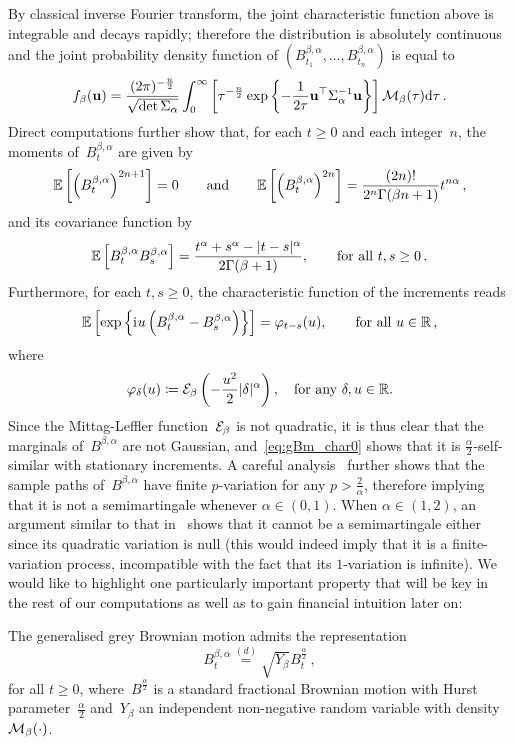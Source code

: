 By classical inverse Fourier transform, the joint characteristic function above is integrable and decays rapidly; therefore the distribution is absolutely continuous and the joint probability density function of $\left(B^{\beta, \alpha}_{t_1}, \ldots, B^{\beta, \alpha}_{t_n}\right)$ is equal to~\cite{daSilva2020SingularityMotion}
$$
    f_\beta(\boldsymbol{\mathrm{u}}) = 
    \frac{(2\pi)^{-\frac{n}{2}}}{\sqrt{\operatorname{det} \Sigma_\alpha}} 
    \int_0^{\infty}
    \left[\tau^{-\frac{n}{2}}\exp\left\{-\frac{1}{2\tau}
    \boldsymbol{\mathrm{u}}^{\top} \Sigma_\alpha^{-1} \boldsymbol{\mathrm{u}}\right\} \right]\mathcal{M}_{\beta}(\tau) \mathrm{d} \tau\,.
$$
Direct computations further show that, 
for each $t \geq 0$ and each integer~$n$, the moments of~$B_t^{\beta, \alpha}$ are given by
$$
\mathbb{E}\left[\left(B_t^{\beta, \alpha}\right)^{2 n+1}\right] = 0
\qquad\text{and}\qquad
\mathbb{E}\left[\left(B_t^{\beta, \alpha}\right)^{2 n}\right] = \frac{(2 n) !}{2^n \Gamma(\beta n+1)} t^{n \alpha}\,,
$$ 
and its covariance function by
$$
    \mathbb{E}\left[B_t^{\beta, \alpha} B_s^{\beta, \alpha}\right]
     = \frac{t^\alpha+s^\alpha-|t-s|^\alpha}{2 \Gamma(\beta+1)}, \qquad \text{for all } t, s \geq 0 \,.
    $$
Furthermore, for each $t, s \geq 0$, the characteristic function of the increments reads
\begin{equation}\label{eq:gBm_char0} \mathbb{E}\left[\exp\left\{{\mathrm{i}\mkern1mu} u\left(B_t^{\beta, \alpha}-B_s^{\beta, \alpha}\right)\right\}\right]
    = \varphi_{t-s}(u), 
    \qquad \text{for all } u \in \mathbb{R}\,, 
\end{equation}
    where
\begin{equation}\label{eq:gBm_char}
\varphi_{\delta}(u)\coloneqq\mathcal{E}_{\beta}\left(-\frac{u^2}{2}|\delta|^\alpha\right), \quad \textup{for any } \delta, u\in\mathbb{R}.
\end{equation}
Since the Mittag-Leffler function~$\mathcal{E}_{\beta}$ is not quadratic, it is thus clear that the marginals of~$B^{\beta, \alpha}$ are not Gaussian,
and~\eqref{eq:gBm_char0} shows that it is $\frac{\alpha}{2}$-self-similar with stationary increments.
A careful analysis~\cite{daSilva2018SingularityParameters} further shows that the sample paths of~$B^{\beta, \alpha}$ have finite $p$-variation for any $p>\frac{2}{\alpha}$, therefore implying that it is not a semimartingale whenever $\alpha\in(0,1)$.
When $\alpha \in (1,2)$, an argument similar to that in~\cite{Rogers1997ArbitrageMotion} shows that it cannot be a semimartingale either since its quadratic variation is null (this would indeed imply that it is a finite-variation process, incompatible with the fact that its $1$-variation is infinite).
We would like to highlight one particularly important property that will be key in the rest of our computations as well as to gain financial intuition later on:
\begin{lemma}\label{lem:gBm_decomposition}
The generalised grey Brownian motion admits the representation
    $$
    B_t^{\beta, \alpha} \stackrel{(d)}{=}
    \sqrt{Y_\beta} B_t^{\frac{\alpha}{2}}\,,
    $$
    for all $t \geq 0$, where~$B^{\frac{\alpha}{2}}$ is a standard fractional Brownian motion with Hurst parameter~$\frac{\alpha}{2}$ and~$Y_\beta$ an independent non-negative random variable with density~$\mathcal{M}_{\beta}(\cdot)$.
\end{lemma}

